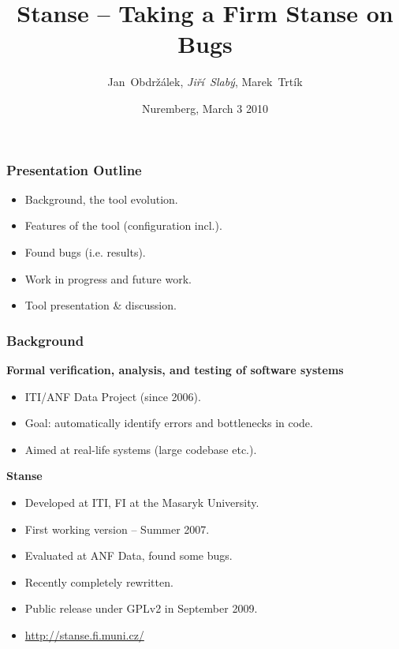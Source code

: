 \documentclass[xcolor=dvipsnames]{beamer}
\title[Stanse] %
{Stanse -- Taking a Firm Stanse on Bugs}
\author[J. Obdržálek, J. Slabý, M. Trtík]{Jan~Obdržálek, \emph{Jiří~Slabý}, Marek~Trtík}
\institute[ITI] %
{ITI, Faculty of Informatics, Masaryk University, Brno}
\date[03.03. 2010, Nuremberg]{Nuremberg, March 3 2010}
\newcommand{\heading}[1]{\textbf{\textcolor{BurntOrange}{#1}}}
\begin{document}
\begin{frame}
  \titlepage
\end{frame}


\begin{frame}
  \frametitle{Presentation Outline}
  \begin{itemize}
  \item Background, the tool evolution.
  \item Features of the tool (configuration incl.).
  \item Found bugs (i.e. results).
  \item Work in progress and future work.
  \item Tool presentation \& discussion.
  \end{itemize}
\end{frame}

\begin{frame}
  \frametitle{Background}
  \heading{Formal verification, analysis, and testing of software
      systems}
  \begin{itemize}
  \item ITI/ANF Data Project (since 2006).
  \item Goal: automatically identify errors and bottlenecks in code.
  \item Aimed at real-life systems (large codebase etc.).
  \end{itemize}

  \pause
  \medskip
  \heading{Stanse}
  \begin{itemize}
  \item Developed at ITI, FI at the Masaryk University.
  \item First working version -- Summer 2007.
  \item Evaluated at ANF Data, found some bugs.
  \item Recently completely rewritten.
  \item Public release under GPLv2 in September 2009.
  \item \url{http://stanse.fi.muni.cz/}
  \end{itemize}

\end{frame}
\end{document}
